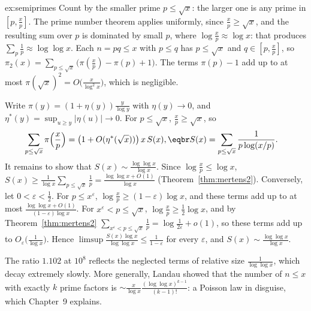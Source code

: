 \begin{solution}{ex:semiprimes}
\idea Count by the smaller prime $p\le\sqrt x$: the larger one is any prime in $[p,\frac xp]$. The prime number theorem applies uniformly, since $\frac xp\ge\sqrt x$, and the resulting sum
over $p$ is dominated by small $p$, where $\log\frac xp\approx\log x$: that produces $\sum_{p}\frac1p\approx\log\log x$.
\writeup Each $n=pq\le x$ with $p\le q$ has $p\le\sqrt x$ and $q\in[p,\frac xp]$, so $\pi_2(x)=\sum_{p\le\sqrt x}\bigl(\pi(\frac xp)-\pi(p)+1\bigr)$. The terms $\pi(p)-1$ add up to at most
$\pi(\sqrt x)^2=O\bigl(\frac x{\log^2x}\bigr)$, which is negligible.

Write $\pi(y)=(1+\eta(y))\frac y{\log y}$ with $\eta(y)\to0$, and $\eta^*(y)=\sup_{u\ge y}|\eta(u)|\to0$. For $p\le\sqrt x$, $\frac xp\ge\sqrt x$, so
\[
\begin{aligned}\sum_{p\le\sqrt x}\pi\Bigl(\frac xp\Bigr)&=\bigl(1+O(\eta^*(\sqrt x))\bigr)\,x\,S(x),\eqbr S(x)=\sum_{p\le\sqrt x}\frac1{p\log(x/p)}.\end{aligned}
\]
It remains to show that $S(x)\sim\frac{\log\log x}{\log x}$. Since $\log\frac xp\le\log x$, $S(x)\ge\frac1{\log x}\sum_{p\le\sqrt x}\frac1p=\frac{\log\log x+O(1)}{\log x}$ (Theorem~\ref{thm:mertens2}). Conversely, let
$0<\varepsilon<\frac12$. For $p\le x^\varepsilon$, $\log\frac xp\ge(1-\varepsilon)\log x$, and these terms add up to at most $\frac{\log\log x+O(1)}{(1-\varepsilon)\log x}$. For $x^\varepsilon<p\le\sqrt x$,
$\log\frac xp\ge\frac12\log x$, and by Theorem~\ref{thm:mertens2} $\sum_{x^\varepsilon<p\le\sqrt x}\frac1p=\log\frac1{2\varepsilon}+o(1)$, so these terms add up to $O_\varepsilon\bigl(\frac1{\log x}\bigr)$. Hence
$\limsup\frac{S(x)\log x}{\log\log x}\le\frac1{1-\varepsilon}$ for every $\varepsilon$, and $S(x)\sim\frac{\log\log x}{\log x}$.

The ratio $1.102$ at $10^8$ reflects the neglected terms of relative size $\frac1{\log\log x}$, which decay extremely slowly. More generally, Landau showed that the number of $n\le x$ with
exactly $k$ prime factors is $\sim\frac x{\log x}\frac{(\log\log x)^{k-1}}{(k-1)!}$: a Poisson law in disguise, which Chapter~9 explains.
\end{solution}

